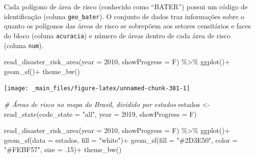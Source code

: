 \documentclass[
  brazilian,
]{book}
\newenvironment{Shaded}{\begin{snugshade}}{\end{snugshade}}
\newcommand{\AttributeTok}[1]{\textcolor[rgb]{0.77,0.63,0.00}{#1}}
\newcommand{\CommentTok}[1]{\textcolor[rgb]{0.56,0.35,0.01}{\textit{#1}}}
\newcommand{\DecValTok}[1]{\textcolor[rgb]{0.00,0.00,0.81}{#1}}
\newcommand{\FunctionTok}[1]{\textcolor[rgb]{0.00,0.00,0.00}{#1}}
\newcommand{\NormalTok}[1]{#1}
\newcommand{\OtherTok}[1]{\textcolor[rgb]{0.56,0.35,0.01}{#1}}
\newcommand{\SpecialCharTok}[1]{\textcolor[rgb]{0.00,0.00,0.00}{#1}}
\newcommand{\StringTok}[1]{\textcolor[rgb]{0.31,0.60,0.02}{#1}}
\begin{document}
Cada polígono de área de risco (conhecido como ``BATER'') possui um código de identificação (coluna \texttt{geo\_bater}). O conjunto de dados traz informações sobre o quanto os polígonos das áreas de risco se sobrepõem aos setores censitários e faces do bloco (coluna \texttt{acuracia}) e número de áreas dentro de cada área de risco (coluna \texttt{num}).

\begin{Shaded}
\begin{Highlighting}[]
\FunctionTok{read\_disaster\_risk\_area}\NormalTok{(}\AttributeTok{year =} \DecValTok{2010}\NormalTok{,}
                        \AttributeTok{showProgress =}\NormalTok{ F) }\SpecialCharTok{\%\textgreater{}\%}
  \FunctionTok{ggplot}\NormalTok{()}\SpecialCharTok{+}
  \FunctionTok{geom\_sf}\NormalTok{()}\SpecialCharTok{+}
  \FunctionTok{theme\_bw}\NormalTok{()}
\end{Highlighting}
\end{Shaded}

\begin{center}\texttt{[image: \_main\_files/figure-latex/unnamed-chunk-381-1]} \end{center}

\begin{Shaded}
\begin{Highlighting}[]
\CommentTok{\# Áreas de risco no mapa do Brasil, dividido por estados}
\NormalTok{estados }\OtherTok{\textless{}{-}} \FunctionTok{read\_state}\NormalTok{(}\AttributeTok{code\_state =} \StringTok{"all"}\NormalTok{,}
                      \AttributeTok{year =} \DecValTok{2019}\NormalTok{,}
                      \AttributeTok{showProgress =}\NormalTok{ F)}

\FunctionTok{read\_disaster\_risk\_area}\NormalTok{(}\AttributeTok{year =} \DecValTok{2010}\NormalTok{,}
                        \AttributeTok{showProgress =}\NormalTok{ F) }\SpecialCharTok{\%\textgreater{}\%}
  \FunctionTok{ggplot}\NormalTok{()}\SpecialCharTok{+}
  \FunctionTok{geom\_sf}\NormalTok{(}\AttributeTok{data =}\NormalTok{ estados, }\AttributeTok{fill =} \StringTok{"white"}\NormalTok{)}\SpecialCharTok{+}
  \FunctionTok{geom\_sf}\NormalTok{(}\AttributeTok{fill =} \StringTok{"\#2D3E50"}\NormalTok{, }\AttributeTok{color =} \StringTok{"\#FEBF57"}\NormalTok{, }\AttributeTok{size =}\NormalTok{ .}\DecValTok{15}\NormalTok{)}\SpecialCharTok{+}
  \FunctionTok{theme\_bw}\NormalTok{()}
\end{Highlighting}
\end{Shaded}
\end{document}
